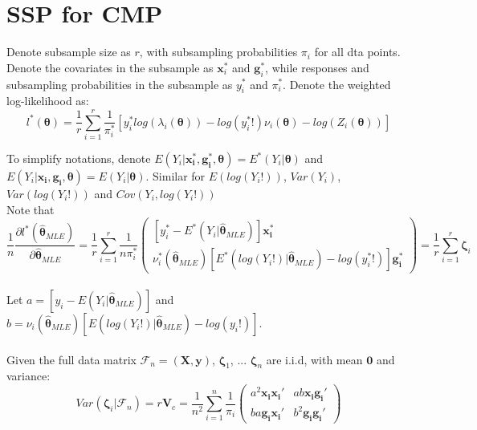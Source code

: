 \documentclass[]{article}
\begin{document}
\section{SSP for CMP}
Denote subsample size as $r$, with subsampling probabilities $\pi_i$ for all dta points. Denote  the covariates in the subsample as $\boldsymbol{x}_i^*$ and $\boldsymbol{g}_i^*$, while responses and subsampling probabilities in the subsample as $y_i^*$ and $\pi_i^*$. Denote the weighted log-likelihood as:
\begin{equation*}
	l^*(\boldsymbol{\theta}) = \frac{1}{r}\sum_{i=1}^{r}\frac{1}{\pi_i^*}[y_i^* log(\lambda_i(\boldsymbol{\theta})) - log(y_i^*!)\nu_i(\boldsymbol{\theta}) - log(Z_i(\boldsymbol{\theta}))]
\end{equation*}

To simplify notations, denote $E(Y_i | \boldsymbol{x_i^*}, \boldsymbol{g_i^*}, \boldsymbol{\theta}) = E^*(Y_i| \boldsymbol{\theta})$ and $E(Y_i | \boldsymbol{x_i}, \boldsymbol{g_i}, \boldsymbol{\theta}) = E(Y_i| \boldsymbol{\theta})$. Similar for $E(log(Y_i!))$, $Var(Y_i)$, $Var(log(Y_i!))$ and $Cov(Y_i, log(Y_i!))$
\\
Note that
\begin{equation*}
	\frac{1}{n}\frac{\partial l^*(\hat{\boldsymbol{\theta}}_{MLE})}{\partial\hat{\boldsymbol{\theta}}_{MLE}} = \frac{1}{r}\sum_{i=1}^{r}\frac{1}{n\pi_i^*}\begin{pmatrix} [y_i^* - E^*(Y_i| \hat{\boldsymbol{\theta}}_{MLE})]\boldsymbol{x_i^*}\\
		\nu_i^*(\hat{\boldsymbol{\theta}}_{MLE})[E^*(log(Y_i!)| \hat{\boldsymbol{\theta}}_{MLE}) - log(y_i^*!)]\boldsymbol{g_i^*}
	\end{pmatrix} = \frac{1}{r}\sum_{i=1}^{r}\boldsymbol{\zeta}_i
\end{equation*}
\\
Let $a = [y_i - E(Y_i| \hat{\boldsymbol{\theta}}_{MLE})]$ and $b = 	\nu_i(\hat{\boldsymbol{\theta}}_{MLE})[E(log(Y_i!)| \hat{\boldsymbol{\theta}}_{MLE}) - log(y_i!)]$. \\
\\
Given the full data matrix $\mathcal{F}_n = (\boldsymbol{X}, \boldsymbol{y})$, $\boldsymbol{\zeta}_1$, ... $\boldsymbol{\zeta}_n$ are i.i.d, with mean $\boldsymbol{0}$ and variance:
\begin{equation*}
	Var(\boldsymbol{\zeta}_i|\mathcal{F}_n) = r\boldsymbol{V}_c = \frac{1}{n^2}\sum_{i=1}^{n}\frac{1}{\pi_i}\begin{pmatrix}
		a^2\boldsymbol{x_i}\boldsymbol{x_i}' &
		ab\boldsymbol{x_i}\boldsymbol{g_i}'\\
		ba\boldsymbol{g_i}\boldsymbol{x_i}' &
		b^2\boldsymbol{g_i}\boldsymbol{g_i}'
	\end{pmatrix}
\end{equation*}
\end{document}
